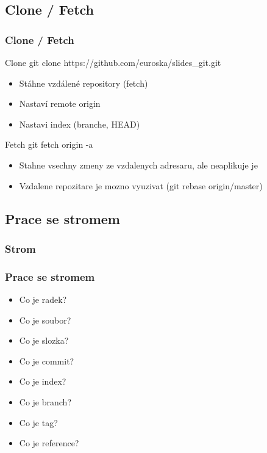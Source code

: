 \documentclass{beamer}
\begin{document}
\subsection{Clone / Fetch}
\begin{frame}
  \frametitle{Clone / Fetch}
  \begin{block}{Clone}
    git clone https://github.com/euroska/slides\_git.git
    \begin{itemize}
     \item Stáhne vzdálené repository (fetch)
     \item Nastaví remote origin
     \item Nastavi index (branche, HEAD)
    \end{itemize}
  \end{block}  
  \begin{block}{Fetch}
    git fetch origin -a
    \begin{itemize}
      \item Stahne vsechny zmeny ze vzdalenych adresaru, ale neaplikuje je
      \item Vzdalene repozitare je mozno vyuzivat (git rebase origin/master)
    \end{itemize}   
  \end{block}
\end{frame}

\subsection{Prace se stromem}
\begin{frame}
  \frametitle{Strom}
  \begin{figure}
    
  \end{figure} 
\end{frame}

\begin{frame}
  \frametitle{Prace se stromem}
  \begin{itemize}
   \item Co je radek?
   \item Co je soubor?
   \item Co je slozka?
   \item Co je commit?
   \item Co je index?
   \item Co je branch?
   \item Co je tag?
   \item Co je reference?
  \end{itemize}
\end{frame}
\end{document}
